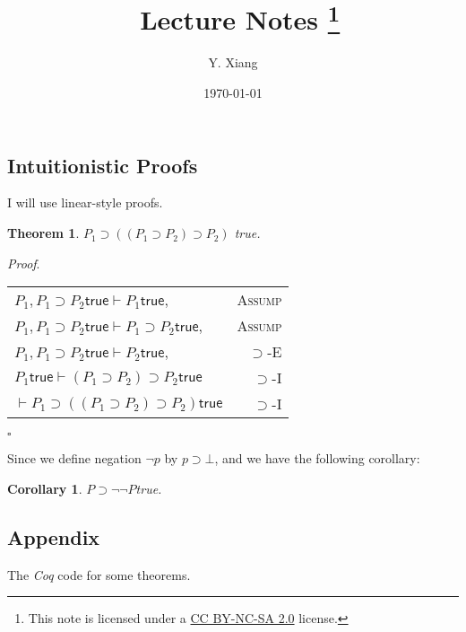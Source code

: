 \documentclass{article}
\title{\vspace{-3em}\course\, Lecture Notes \asnum\footnote{This note is licensed under a \href{https://creativecommons.org/licenses/by-nc-sa/2.0/}{CC BY-NC-SA 2.0} license.}}
\author{Y. Xiang\vspace{1em}}
\date{\today\vspace{-1em}}
\newcounter{rowcount}
\newtheorem{theorem}{Theorem}[section]
\newtheorem{corollary}{Corollary}[theorem]
\newenvironment{proof}{\emph{Proof}.}{\hfill$\square$}
\newcommand{\true}{\textsf{true}}
\begin{document}
\maketitle
\subsection{Intuitionistic Proofs}
I will use linear-style proofs.
\begin{theorem}
    $P_1 \supset ((P_1\supset P_2)\supset P_2)$ \true.
\end{theorem}
\begin{proof}
    \begin{tabular}{@{\stepcounter{rowcount}\therowcount. }lr}
        $P_1,P_1\supset P_2 \true \vdash P_1\true$,                           & \textsc{Assump} \\
        $P_1,P_1\supset P_2 \true \vdash P_1\supset P_2\true$,                & \textsc{Assump} \\
        $P_1,P_1\supset P_2 \true \vdash P_2 \true$,                          & $\supset$-E     \\
        $P_1\true \vdash (P_1\supset P_2) \supset P_2 \true$                  & $\supset$-I     \\
        $\vdash P_1 \supset \left( (P_1\supset P_2) \supset P_2 \right)\true$ & $\supset$-I     \\
    \end{tabular}
\end{proof}

Since we define negation $\neg p$ by $p \supset \bot$, and we have the following corollary:
\begin{corollary}
    $P\supset \neg \neg P$\true.
\end{corollary}

\subsection*{Appendix}
The \emph{Coq} code for some theorems.

\end{document}
